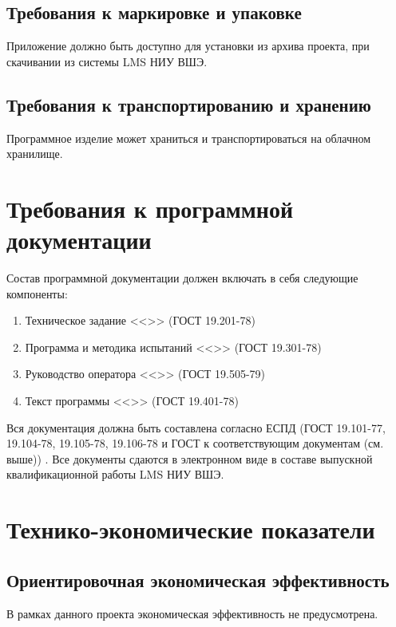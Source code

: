\documentclass[a4paper,12pt,reqno]{article}
\begin{document}
    \subsection{Требования к маркировке и упаковке}
    Приложение должно быть доступно для установки из архива проекта, при скачивании из системы LMS НИУ ВШЭ.

    \subsection{Требования к транспортированию и хранению}
    Программное изделие может храниться и транспортироваться на облачном хранилище.
    \newpage


    \section{Требования к программной документации}
    Состав программной документации должен включать в себя следующие компоненты:
    \begin{enumerate}
        \item Техническое задание <<\unskip>> (ГОСТ 19.201-78) \label{tz}
        \item Программа и методика испытаний <<\unskip>> (ГОСТ 19.301-78) \label{pmi}
        \item Руководство оператора <<\unskip>> (ГОСТ 19.505-79) \label{ro}
        \item Текст программы <<\unskip>> (ГОСТ 19.401-78) \label{tp}
    \end{enumerate}

    \indent
    Вся документация должна быть составлена согласно ЕСПД (ГОСТ 19.101-77, 19.104-78, 19.105-78, 19.106-78 и ГОСТ к соответствующим документам (см. выше)) \cite{TZ:gost0, TZ:gost1, TZ:gost2, TZ:gost3, TZ:gost4, TZ:gost5, TZ:gost6, TZ:gost7, TZ:gost8, TZ:gost9, TZ:gost10, TZ:gost11}. Все документы сдаются в электронном виде в составе выпускной квалификационной работы LMS НИУ ВШЭ.
    \newpage


    \section{Технико-экономические показатели}

    \subsection{Ориентировочная экономическая эффективность}
    В рамках данного проекта экономическая эффективность не предусмотрена.
\end{document}
